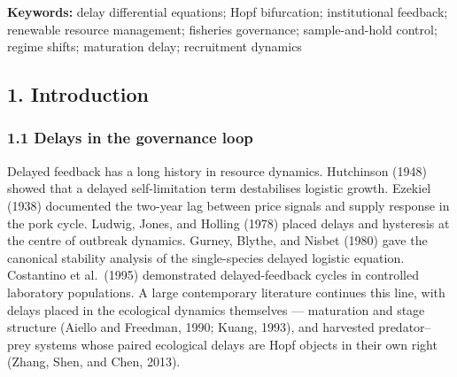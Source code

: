 \documentclass[11pt]{article}
\begin{document}
\begin{abstract}
The analysed class is deliberately stock-agnostic --- a harvested
renewable stock under institutional control, with fisheries as the
motivating instance --- so the mechanism's coordinates (the response
rule's sign structure, the deployment delay, and the review cadence) are
available to any periodically reviewed renewable-resource regime. The
form and timing of institutional response, not ecological lag alone,
determine whether governance stabilises or destabilises a harvested
stock; the review interval acts as a local spectral design parameter,
with opposite effects under the two rules.

\end{abstract}

\textbf{Keywords:} delay differential equations; Hopf bifurcation;
institutional feedback; renewable resource management; fisheries
governance; sample-and-hold control; regime shifts; maturation delay;
recruitment dynamics

\subsection{1. Introduction}\label{introduction}

\subsubsection{1.1 Delays in the governance
loop}\label{delays-in-the-governance-loop}

Delayed feedback has a long history in resource dynamics. Hutchinson
(1948) showed that a delayed self-limitation term destabilises logistic
growth. Ezekiel (1938) documented the two-year lag between price signals
and supply response in the pork cycle. Ludwig, Jones, and Holling (1978)
placed delays and hysteresis at the centre of outbreak dynamics. Gurney,
Blythe, and Nisbet (1980) gave the canonical stability analysis of the
single-species delayed logistic equation. Costantino et al.~(1995)
demonstrated delayed-feedback cycles in controlled laboratory
populations. A large contemporary literature continues this line, with
delays placed in the ecological dynamics themselves --- maturation and
stage structure (Aiello and Freedman, 1990; Kuang, 1993), and harvested
predator--prey systems whose paired ecological delays are Hopf objects
in their own right (Zhang, Shen, and Chen, 2013).
\end{document}
